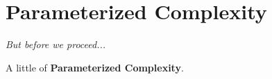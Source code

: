 \documentclass[10pt,aspectratio=169,english]{beamer}
\begin{document}
\section{Parameterized Complexity}

\begin{frame}
	\textit{But before we proceed...}
	
	A little of \textbf{Parameterized Complexity}.
\end{frame}

\end{document}
